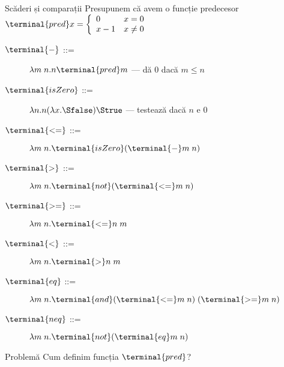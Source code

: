 \documentclass[xcolor=pdftex,romanian,colorlinks]{beamer}
\newcommand{\SSnot}{\terminal{not}}
\newcommand{\Sand}{\terminal{and}}
\newcommand{\Spred}{\terminal{pred}}
\newcommand{\Seq}{\terminal{eq}}
\newcommand{\Sneq}{\terminal{neq}}
\newcommand{\SisZero}{\terminal{isZero}}
\newcommand{\Slte}{\terminal{<=}}
\newcommand{\Sgte}{\terminal{>=}}
\newcommand{\Slt}{\terminal{<}}
\newcommand{\Sgt}{\terminal{>}}
\newcommand{\Sminus}{\terminal{-}}
\begin{document}
\begin{frame}{Scăderi și comparații}
  Presupunem că avem o funcție predecesor
  $\Spred x = \left\{\begin{array}{lr}0 & x = 0\\x-1 & x\neq 0 \end{array}\right.$
  \begin{description}
  \item[$\Sminus$ ::= ] \pause $\lambda m\; n.n \Spred m$  --- dă 0 dacă $m \leq n$
  \item[$\SisZero$ ::= ] \pause $\lambda n.n (\lambda x.\Sfalse) \Strue$ --- testează dacă $n$ e $0$
  \item[$\Slte$ ::=] \pause $\lambda m\; n.\SisZero (\Sminus m\; n)$
  \item[$\Sgt$ ::=] \pause $\lambda m\; n.\SSnot (\Slte m\; n)$
  \item[$\Sgte$ ::=] $\lambda m\; n.\Slte n\; m$
  \item[$\Slt$ ::=] $\lambda m\; n.\Sgt n\; m$
  \item[$\Seq$ ::=] \pause $\lambda m\; n.\Sand (\Slte m\; n)\; (\Sgte m\; n)$
  \item[$\Sneq$ ::=] $\lambda m\; n.\SSnot (\Seq m\; n)$
  \end{description}

  \begin{block}{Problemă}
    Cum definim funcția $\Spred$?
  \end{block}
\end{frame}
\end{document}
